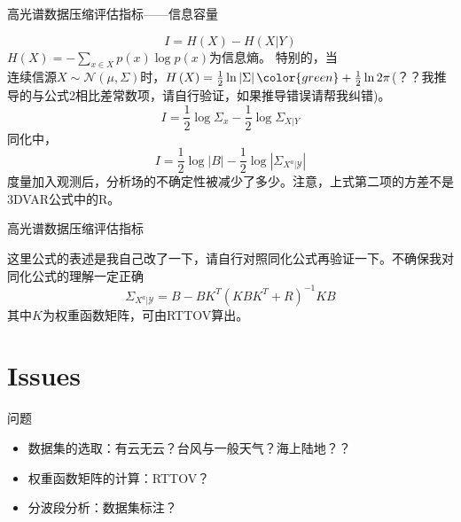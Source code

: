\documentclass[aspectratio=43]{beamer}
\begin{document}
\begin{frame}{高光谱数据压缩评估指标——信息容量}
\begin{cardTiny}
\begin{equation}
I=H\left(X\right)-H\left(X|Y\right)
\end{equation}
$H\left(X\right)=-\sum\limits_{x\in X}p\left(x\right)\log p\left(x\right)$为信息熵。
特别的，当$连续信源X \sim \mathcal{N} \left( \mu,\Sigma \right)$时，$H\left(X\right)=\frac{1}{2}\ln \left| \Sigma \right|{\color{green}+\frac{1}{2}\ln 2\pi}$(？？我推导的与\cite{杜华栋2010}公式2相比差常数项，请自行验证，如果推导错误请帮我纠错)。
\begin{equation}
I=\frac{1}{2}\log \Sigma_x-\frac{1}{2}\log \Sigma_{X|Y}
\end{equation}
同化中，
\begin{equation}
I=\frac{1}{2}\log \left|B\right|-\frac{1}{2}\log \left|\Sigma_{X^a|\mathcal{Y}}\right|
\end{equation}
{\color{primary}度量加入观测后，分析场的不确定性被减少了多少。}注意，上式第二项的方差不是3DVAR公式中的R。
\end{cardTiny}
\end{frame}

\begin{frame}{高光谱数据压缩评估指标}
\begin{card}
{\color{green}这里公式的表述是我自己改了一下，请自行对照同化公式再验证一下。不确保我对同化公式的理解一定正确}
\begin{equation}
\Sigma_{X^a|\mathcal{Y}}=B-BK^T\left(KBK^T+R\right)^{-1}KB
\end{equation}
其中$K$为权重函数矩阵，可由RTTOV算出。
\end{card}
\end{frame}



\section{Issues}
\begin{frame}{问题}
\begin{itemize}
\item 数据集的选取：有云无云？台风与一般天气？海上陆地？？
\item 权重函数矩阵的计算：RTTOV？
\item 分波段分析：数据集标注？
\end{itemize}
\end{frame}
\end{document}
